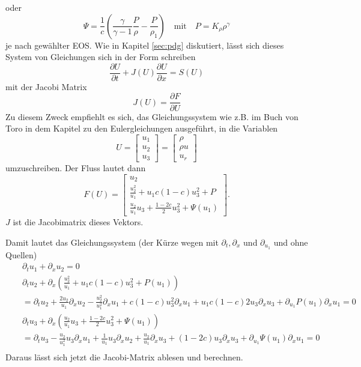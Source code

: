 oder
\begin{equation}
\Psi = \frac{1}{c}\left(\frac{\gamma}{\gamma-1} \frac{P}{\rho} -
\frac{P}{\rho_1}\right)\quad\mbox{mit}\quad P = K_\rho \rho^\gamma 
\end{equation}
je nach gewählter EOS. Wie in Kapitel \ref{sec:pdg} diskutiert, lässt
sich dieses System von Gleichungen sich in der Form schreiben
\[
\frac{\partial U}{\partial t} + J(U) \frac{\partial U}{\partial x} =
S(U)
\]
mit der Jacobi Matrix
\[
 J(U) = \frac{\partial F}{\partial U}
\]
Zu diesem Zweck empfiehlt es sich, das Gleichungssystem wie z.B. im
Buch von Toro in dem Kapitel zu den Eulergleichungen ausgeführt, in
die Variablen
\[
U = \left[\begin{array}{c}u_1 \\ u_2 \\ u_3\end{array}\right]
=  \left[\begin{array}{c}\rho \\ \rho u \\ u_r\end{array}\right]
\]
umzuschreiben. Der Fluss lautet dann
\[
F(U) = \left[\begin{array}{c} u_2 \\[2mm] 
\frac{u_2^2}{u_1} + u_1 c (1-c) u_3^2 + P\\[2mm] 
\frac{u_2}{u_1} u_3 + \frac{1-2c}{2} u_3^2 + \Psi(u_1)\end{array}\right]. 
\]
$J$ ist die Jacobimatrix dieses Vektors. 

Damit lautet das Gleichungssystem (der Kürze
wegen mit $\partial_t, \partial_x$ und $\partial_{u_1}$ und ohne Quellen)
\begin{eqnarray*}
&& \partial_t u_1 + \partial_x u_2 = 0\\
&& \partial_t u_2 + \partial_x (\frac{u_2^2}{u_1} + u_1 c (1-c) u_3^2 + P(u_1))\\
&& = \partial_t u_2 + \frac{2 u_2}{u_1} \partial_x u_2
                    - \frac{u_2^2}{u_1^2} \partial_x u_1
                    + c (1-c) u_3^2  \partial_x u_1
                    + u_1 c (1-c) 2 u_3  \partial_x u_3
                    + \partial_{u_1}P(u_1) \partial_x u_1 =0 \\
&& \partial_t u_3 + \partial_x (\frac{u_2}{u_1} u_3 + \frac{1-2c}{2}
                    u_3^2 + \Psi(u_1))\\
&& = \partial_t u_3 - \frac{u_2}{u_1^2} u_3 \partial_x u_1
                    + \frac{1}{u_1} u_3 \partial_x u_2
                    + \frac{u_2}{u_1} \partial_x u_3 
                    + (1-2c) u_3 \partial_x u_3 
                    + \partial_{u_1}\Psi(u_1) \partial_x u_1  = 0 \\
\end{eqnarray*}
Daraus lässt sich jetzt die Jacobi-Matrix ablesen und berechnen.


